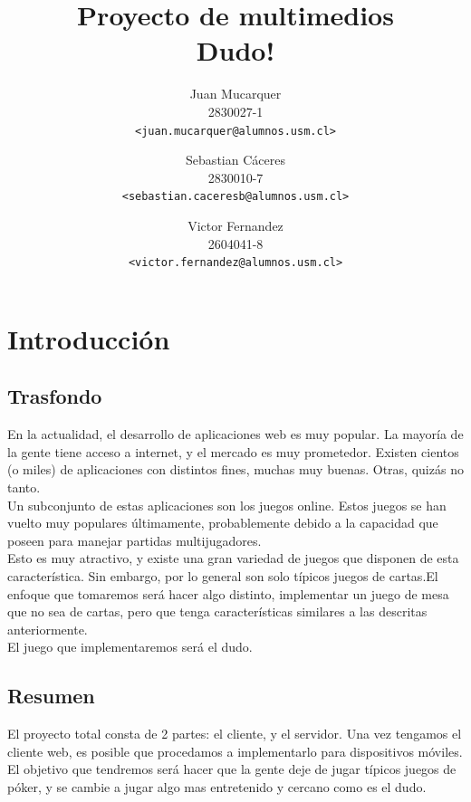 \documentclass[a4paper,11pt]{article}
\title{Proyecto de multimedios\\Dudo!}
\author{Juan Mucarquer\\2830027-1\\\small{\texttt{<juan.mucarquer@alumnos.usm.cl>}} \and Sebastian Cáceres\\2830010-7\\\small{\texttt{<sebastian.caceresb@alumnos.usm.cl>}} \and Victor Fernandez\\2604041-8\\\small{\texttt{<victor.fernandez@alumnos.usm.cl>}}}
\begin{document}
%	
\maketitle

\newpage
\tableofcontents
\newpage

\section{Introducción}
\subsection{Trasfondo}
	En la actualidad, el desarrollo de aplicaciones web es muy popular. 
La mayoría de la gente tiene acceso a internet, y el mercado es muy prometedor.
Existen cientos (o miles) de aplicaciones con distintos fines, muchas muy 
buenas. Otras, quizás no tanto. \\

	Un subconjunto de estas aplicaciones son los juegos online. Estos 
juegos se han vuelto muy populares últimamente, probablemente debido a la
capacidad que poseen para manejar partidas multijugadores.\\

 Esto es muy atractivo, y existe una gran variedad de juegos que disponen 
de esta característica. Sin embargo, por lo general son solo típicos juegos 
de cartas.El enfoque que tomaremos será hacer algo distinto, implementar 
un juego de mesa que no sea de cartas, pero que tenga características 
similares a las descritas anteriormente. \\

El juego que implementaremos será el dudo.  
	

\subsection{Resumen}

	El proyecto total consta de 2 partes: el cliente, y el servidor. Una 
vez tengamos el cliente web, es posible que procedamos a implementarlo para 
dispositivos móviles. El objetivo que tendremos será hacer que la gente deje
de jugar típicos juegos de póker, y se cambie a jugar algo mas entretenido y
cercano como es el dudo.\\
\end{document}
